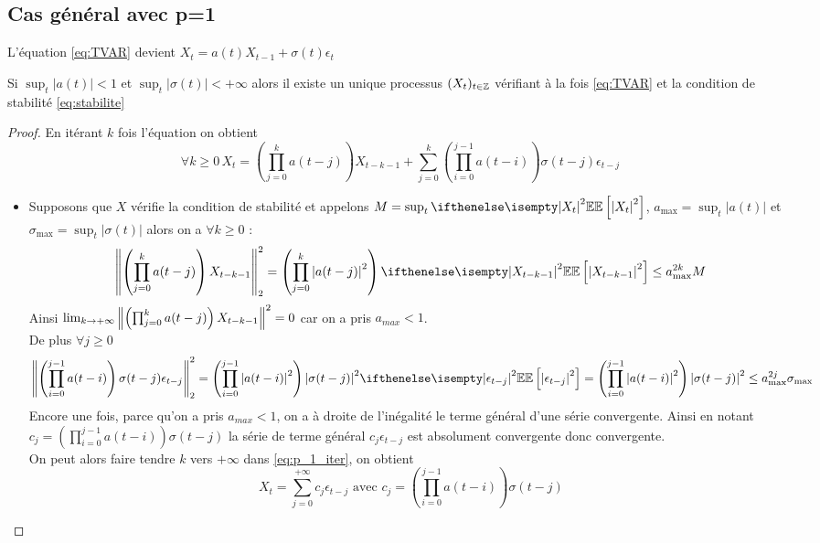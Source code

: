 \documentclass[a4paper,french]{article}
\begin{document}
\subsection{Cas général avec p=1}
L'équation \eqref{eq:TVAR} devient $X_t = a(t)X_{t-1} + \sigma(t) \epsilon_t$
\begin{Prop}
Si $\sup_t |a(t)| < 1$ et $\sup_t |\sigma(t)| < +\infty$ alors il existe un unique processus $(X_t)_{t \in \mathbb{Z}}$ vérifiant à la fois \eqref{eq:TVAR} et la condition de stabilité \eqref{eq:stabilite}
\end{Prop}
\begin{proof}
En itérant $k$ fois l'équation on obtient 
\begin{equation}\label{eq:p_1_iter} 
\forall k \geq 0 \, X_t = \left( \prod_{j=0}^{k} a(t-j)  \right) X_{t-k-1} + \sum_{j=0}^k \left( \prod_{i=0}^{j-1} a(t-i) \right) \sigma(t-j)\epsilon_{t-j}
\end{equation}
\begin{itemize}
\item Supposons que $X$ vérifie la condition de stabilité et appelons $M = \sup_t \EE[\abs{X_t}^2]$, $a_{\max} = \sup_t |a(t)|$ et $\sigma_{\max} = \sup_t |\sigma(t)|$ alors on a $\forall k \geq 0$ :
\[
\norm{\left( \prod_{j=0}^{k} a(t-j)  \right) X_{t-k-1} }_2^2 = \left( \prod_{j=0}^{k} \abs{a(t-j)}^2 \right) \EE[\abs{X_{t-k-1}}^2] \leq a_{\max}^{2k} M
\]
Ainsi $\lim_{k \rightarrow +\infty} { \left\| \left( \prod_{j=0}^{k} a(t-j)  \right) X_{t-k-1}  \right\|}^2 = 0$ car on a pris $a_{max} < 1$.\\ 
De plus $\forall j \geq 0$
\begin{equation}\label{eq:p_1_sommabilite}
\norm{\left( \prod_{i=0}^{j-1} a(t-i) \right) \sigma(t-j)\epsilon_{t-j}}_2^2 =  \left( \prod_{i=0}^{j-1} \abs{a(t-i)}^2 \right) \abs{\sigma(t-j)}^2 \EE[\abs{\epsilon_{t-j}}^2]
= \left( \prod_{i=0}^{j-1} \abs{a(t-i)}^2 \right) \abs{\sigma(t-j)}^2
\leq a_{\max}^{2j} \sigma_{\max}
\end{equation}
Encore une fois, parce qu'on a pris $a_{max}<1$, on a à droite de l'inégalité le terme général d'une série convergente. Ainsi en notant $c_j = \left( \prod_{i=0}^{j-1} a(t-i) \right) \sigma(t-j)$ la série de terme général $c_j \epsilon_{t-j}$ est absolument convergente donc convergente. \\
On peut alors faire tendre $k$ vers $+\infty$ dans \eqref{eq:p_1_iter}, on obtient 
\begin{equation}\label{eq:p_1_solution}
X_t = \sum_{j=0}^{+\infty} c_j  \epsilon_{t-j} \text{ avec } c_j = \left( \prod_{i=0}^{j-1} a(t-i) \right) \sigma(t-j)

\end{equation}
\end{itemize}
\end{proof}
\end{document}
